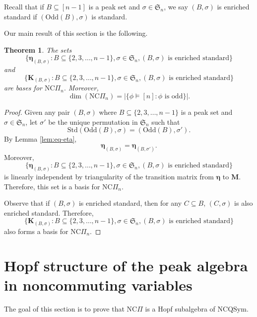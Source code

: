 \documentclass[11pt]{amsart}
\newtheorem{Theorem}{Theorem}[section]
\numberwithin{equation}{section}
\newcommand{\NCQSym}{\mathrm{NCQSym}}
\newcommand{\odd}{\mathrm{Odd}}
\newcommand{\std}{\mathrm{Std}}
\newcommand{\NCPeak}{\mathrm{NC}\Pi}
\newcommand{\frakS}{{\mathfrak{S}}}
\newcommand{\bfM}{{\mathbf{M}}}
\newcommand{\bfK}{{\mathbf{K}}}
\newcommand{\boldeta}{{\boldsymbol{\eta}}}
\begin{document}
Recall that if $B\subseteq [n-1]$ is a peak set and $\sigma\in \mathfrak{S}_n$, we say $(B,\sigma)$ is  enriched standard if $(\odd(B),\sigma)$ is standard. 

Our main result of this section is the following. 

\begin{Theorem}\label{Thm:NCPeakBasis}
The sets 
$$\{\boldeta_{(B,\sigma)}:B\subseteq \{2,3,\dots,n-1\}, \sigma\in\mathfrak{S}_n, (B,\sigma) \text{~is  enriched standard}   \}$$ and 
 $$\{\bfK_{(B,\sigma)}:B\subseteq \{2,3,\dots,n-1\}, \sigma\in\mathfrak{S}_n, (B,\sigma) \text{~is  enriched standard}   \}$$
  are bases for $\NCPeak_n.$ Moreover, 
$$\dim (\NCPeak_n)=|\{ \phi\vDash [n]: \phi \text{~is odd}\}|.$$
\end{Theorem} 

\begin{proof}
Given any pair $(B,\sigma)$ where $B\subseteq \{2,3,\dots,n-1\}$ is a peak set and $\sigma\in \frakS_n$, let $\sigma'$ be the unique permutation in $\mathfrak{S}_n$ such that 
$$\std(\odd(B),\sigma)=(\odd(B),\sigma').$$
By Lemma \ref{lem:eq-eta}, 
$$\boldeta_{(B,\sigma)}=\boldeta_{(B,\sigma')}.$$
Moreover,  $$\{\boldeta_{(B,\sigma)}: B\subseteq \{2,3,\dots,n-1\}, \sigma\in\mathfrak{S}_n, (B,\sigma) \text{~is enriched standard}  \}$$ is linearly independent by triangularity of the transition matrix from $\boldeta$ to $\bfM$. Therefore, 
this set is a basis for $\NCPeak_n$. 

Observe that if $(B,\sigma)$ is enriched standard, then for any $C\subseteq B$, $(C,\sigma)$ is also enriched standard. Therefore, $$\{\bfK_{(B,\sigma)}:B\subseteq \{2,3,\dots,n-1\}, \sigma\in\mathfrak{S}_n, (B,\sigma) \text{~is  enriched standard}   \}$$ also forms a basis for $\NCPeak_n$.
\end{proof}



\section{Hopf structure of the peak algebra in noncommuting variables}\label{Sec:NCPeak}


The goal of this section is to prove that $\NCPeak$ is a Hopf subalgebra of $\NCQSym$.
\end{document}
